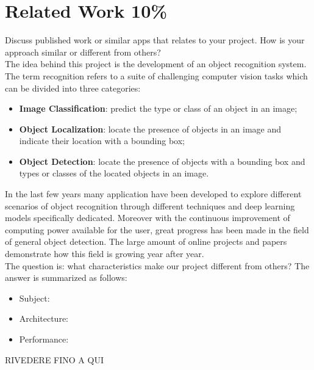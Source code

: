 \section{Related Work 10\%}
Discuss published work or similar apps that relates to your project. How is your approach similar or different from others?\\
The idea behind this project is the development of an object recognition system. The term recognition refers to a suite of challenging computer vision tasks which can be divided into three categories:
\begin{itemize}
	\item\textbf{Image Classification}: predict the type or class of an object in an image;
	\item\textbf{Object Localization}: locate the presence of objects in an image and indicate their location with a bounding box;
	\item\textbf{Object Detection}: locate the presence of objects with a bounding box and types or classes of the located objects in an image.
\end{itemize}
In the last few years many application have been developed to explore different scenarios of object recognition through different techniques and deep learning models specifically dedicated. Moreover with the continuous improvement of computing power available for the user, great progress has been made in the field of general object detection. The large amount of online projects and papers demonstrate how this field is growing year after year.\\
The question is: what characteristics make our project different from others? The answer is summarized as follows:
\begin{itemize}
	\item Subject: 
	\item Architecture:
	\item Performance:		
\end{itemize}

RIVEDERE FINO A QUI
